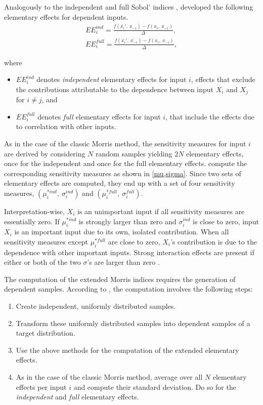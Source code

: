 Analogously to the independent and full Sobol' indices \citep{MTA15}, \citet{GM17} developed the following elementary effects for dependent inputs.
\begin{align}
EE_i^{ind} = \frac{f(\bar{x_i}',\ x_{-i}) - f(x_i,\ x_{-i})}{\Delta},\\
EE_i^{full} = \frac{f(x_i',\ \bar{x_{-i}}) - f(x_i,\ x_{-i})}{\Delta},
\end{align}

\noindent where
\begin{itemize}
\item $EE_i^{ind}$ denotes \textit{independent} elementary effects for input $i$, effects that exclude the contributions attributable to the dependence between input $X_i$ and $X_j$ for $i \neq j$, and
\item $EE_i^{full}$ denotes \textit{full} elementary effects for input $i$, that include the effects due to correlation with other inputs.
\end{itemize}

As in the case of the classic Morris method, the sensitivity measures for input $i$ are derived by considering $N$ random samples yielding $2 N$ elementary effects, once for the independent and once for the full elementary effects. \citet{GM17} compute the corresponding sensitivity measures as shown in \cref{mu,sigma}. Since two sets of elementary effects are computed, they end up with a set of four sensitivity measures, $(\mu^{\ast ind}_i,\ \sigma_i^{ind})$ and $(\mu^{\ast full}_i,\ \sigma_i^{full})$.

Interpretation-wise, $X_i$ is an unimportant input if all sensitivity measures are essentially zero. If $\mu^{\ast ind}_i$ is strongly larger than zero and $\sigma_i^{ind}$ is close to zero, input $X_i$ is an important input due to its own, isolated contribution. When all sensitivity measures except $\mu^{\ast full}_i$ are close to zero, $X_i$'s contribution is due to the dependence with other important inputs. Strong interaction effects are present if either or both of the two $\sigma$'s are larger than zero \citep{GM17}.

The computation of the extended Morris indices requires the generation of dependent samples. According to \citet{GM17}, the computation involves the following steps:

\begin{enumerate}
    \item Create independent, uniformly distributed samples.
    \item Transform these uniformly distributed samples into dependent samples of a target distribution.
    \item Use the above methods for the computation of the extended elementary effects.
    \item As in the case of the classic Morris method, average over all $N$ elementary effects per input $i$ and compute their standard deviation. Do so for the \textit{independent} and \textit{full} elementary effects.
\end{enumerate}

